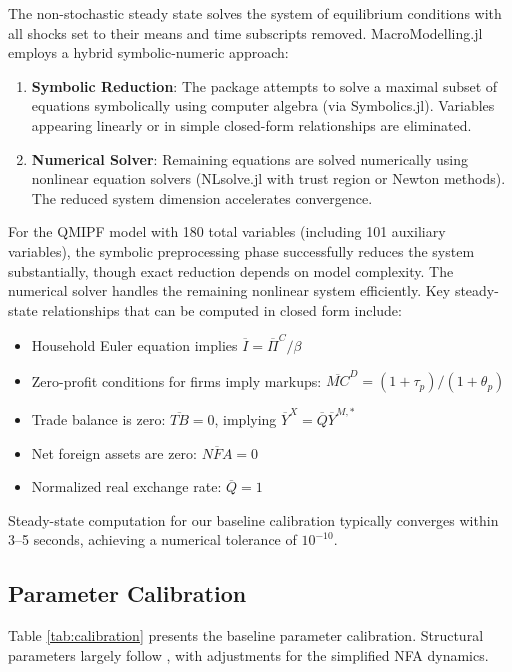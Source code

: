 \documentclass[12pt]{article}
\begin{document}
The non-stochastic steady state solves the system of equilibrium conditions with all shocks set to their means and time subscripts removed. MacroModelling.jl employs a hybrid symbolic-numeric approach:
\begin{enumerate}
\item \textbf{Symbolic Reduction}: The package attempts to solve a maximal subset of equations symbolically using computer algebra (via Symbolics.jl). Variables appearing linearly or in simple closed-form relationships are eliminated.
\item \textbf{Numerical Solver}: Remaining equations are solved numerically using nonlinear equation solvers (NLsolve.jl with trust region or Newton methods). The reduced system dimension accelerates convergence.
\end{enumerate}

For the QMIPF model with 180 total variables (including 101 auxiliary variables), the symbolic preprocessing phase successfully reduces the system substantially, though exact reduction depends on model complexity. The numerical solver handles the remaining nonlinear system efficiently. Key steady-state relationships that can be computed in closed form include:
\begin{itemize}
\item Household Euler equation implies $\overline{I} = \overline{\Pi}^C / \beta$
\item Zero-profit conditions for firms imply markups: $\overline{MC}^D = (1+\tau_p)/(1+\theta_p)$
\item Trade balance is zero: $\overline{TB} = 0$, implying $\overline{Y}^X = \overline{Q} \overline{Y}^{M,*}$
\item Net foreign assets are zero: $\overline{NFA} = 0$
\item Normalized real exchange rate: $\overline{Q} = 1$
\end{itemize}

Steady-state computation for our baseline calibration typically converges within 3--5 seconds, achieving a numerical tolerance of $10^{-10}$.

\subsection{Parameter Calibration}

Table \ref{tab:calibration} presents the baseline parameter calibration. Structural parameters largely follow \citet{adrian2021quantitative}, with adjustments for the simplified NFA dynamics.
\end{document}
